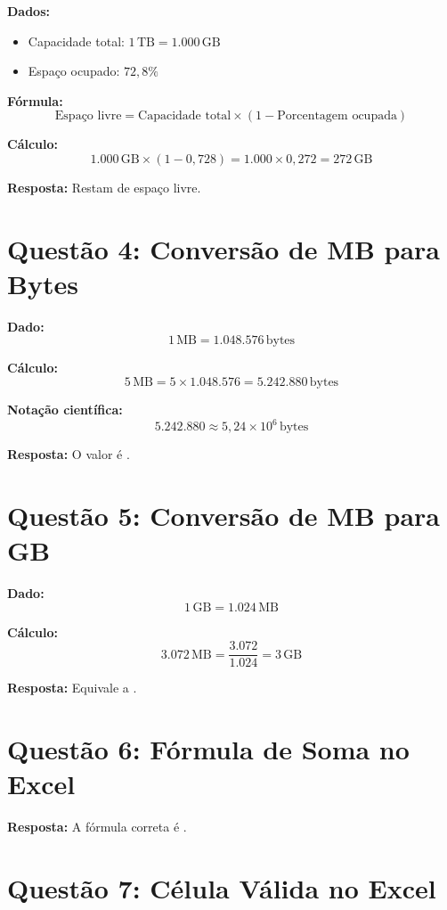 \documentclass{article}
\begin{document}
\textbf{Dados:}
\begin{itemize}
    \item Capacidade total: $1\,\text{TB} = 1.000\,\text{GB}$
    \item Espaço ocupado: $72,8\%$
\end{itemize}

\textbf{Fórmula:}
\[
\text{Espaço livre} = \text{Capacidade total} \times (1 - \text{Porcentagem ocupada})
\]

\textbf{Cálculo:}
\[
1.000\,\text{GB} \times (1 - 0,728) = 1.000 \times 0,272 = 272\,\text{GB}
\]

\textbf{Resposta:} Restam  de espaço livre.

\section*{Questão 4: Conversão de MB para Bytes}

\textbf{Dado:}
\[
1\,\text{MB} = 1.048.576\,\text{bytes}
\]

\textbf{Cálculo:}
\[
5\,\text{MB} = 5 \times 1.048.576 = 5.242.880\,\text{bytes}
\]

\textbf{Notação científica:}
\[
5.242.880 \approx 5,24 \times 10^6\,\text{bytes}
\]

\textbf{Resposta:} O valor é .

\section*{Questão 5: Conversão de MB para GB}

\textbf{Dado:}
\[
1\,\text{GB} = 1.024\,\text{MB}
\]

\textbf{Cálculo:}
\[
3.072\,\text{MB} = \frac{3.072}{1.024} = 3\,\text{GB}
\]

\textbf{Resposta:} Equivale a .

\section*{Questão 6: Fórmula de Soma no Excel}

\textbf{Resposta:} A fórmula correta é .

\section*{Questão 7: Célula Válida no Excel}
\end{document}
